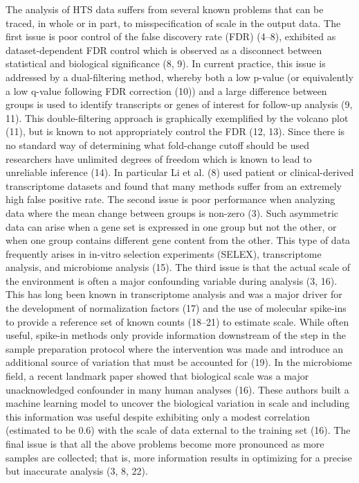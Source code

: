 \documentclass[
]{article}
\begin{document}
The analysis of HTS data suffers from several known problems that can be
traced, in whole or in part, to misspecification of scale in the output
data. The first issue is poor control of the false discovery rate (FDR)
(4--8), exhibited as dataset-dependent FDR control which is observed as
a disconnect between statistical and biological significance (8, 9). In
current practice, this issue is addressed by a dual-filtering method,
whereby both a low p-value (or equivalently a low q-value following FDR
correction (10)) and a large difference between groups is used to
identify transcripts or genes of interest for follow-up analysis (9,
11). This double-filtering approach is graphically exemplified by the
volcano plot (11), but is known to not appropriately control the FDR
(12, 13). Since there is no standard way of determining what fold-change
cutoff should be used researchers have unlimited degrees of freedom
which is known to lead to unreliable inference (14). In particular Li et
al. (8) used patient or clinical-derived transcriptome datasets and
found that many methods suffer from an extremely high false positive
rate. The second issue is poor performance when analyzing data where the
mean change between groups is non-zero (3). Such asymmetric data can
arise when a gene set is expressed in one group but not the other, or
when one group contains different gene content from the other. This type
of data frequently arises in in-vitro selection experiments (SELEX),
transcriptome analysis, and microbiome analysis (15). The third issue is
that the actual scale of the environment is often a major confounding
variable during analysis (3, 16). This has long been known in
transcriptome analysis and was a major driver for the development of
normalization factors (17) and the use of molecular spike-ins to provide
a reference set of known counts (18--21) to estimate scale. While often
useful, spike-in methods only provide information downstream of the step
in the sample preparation protocol where the intervention was made and
introduce an additional source of variation that must be accounted for
(19). In the microbiome field, a recent landmark paper showed that
biological scale was a major unacknowledged confounder in many human
analyses (16). These authors built a machine learning model to uncover
the biological variation in scale and including this information was
useful despite exhibiting only a modest correlation (estimated to be
0.6) with the scale of data external to the training set (16). The final
issue is that all the above problems become more pronounced as more
samples are collected; that is, more information results in optimizing
for a precise but inaccurate analysis (3, 8, 22).
\end{document}
